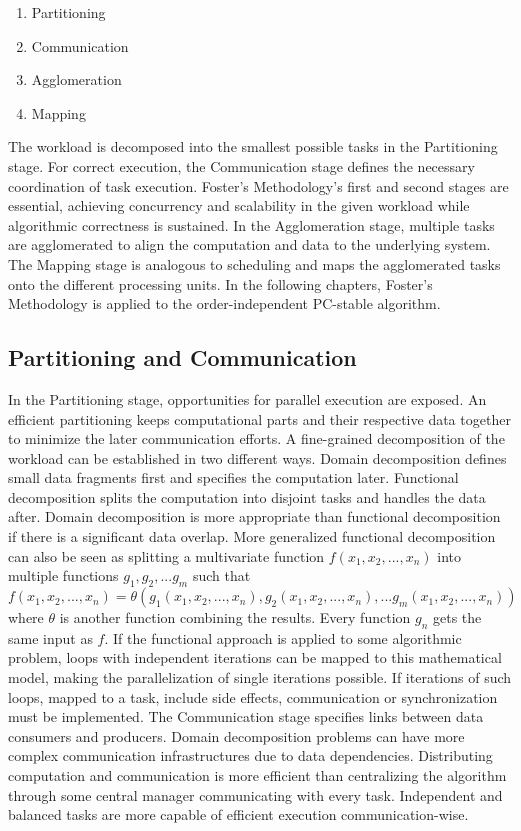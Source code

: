 \begin{enumerate}
    \item Partitioning
    \item Communication
    \item Agglomeration 
    \item Mapping
\end{enumerate}

The workload is decomposed into the smallest possible tasks in the Partitioning stage. For correct execution, the Communication stage defines the necessary coordination of task execution. Foster's Methodology's first and second stages are essential, achieving concurrency and scalability in the given workload while algorithmic correctness is sustained. In the Agglomeration stage, multiple tasks are agglomerated to align the computation and data to the underlying system. The Mapping stage is analogous to scheduling and maps the agglomerated tasks onto the different processing units. In the following chapters, Foster's Methodology is applied to the order-independent PC-stable algorithm.

\subsection{Partitioning and Communication}
In the Partitioning stage, opportunities for parallel execution are exposed. An efficient partitioning keeps computational parts and their respective data together to minimize the later communication efforts. A fine-grained decomposition of the workload can be established in two different ways. Domain decomposition defines small data fragments first and specifies the computation later. Functional decomposition splits the computation into disjoint tasks and handles the data after. Domain decomposition is more appropriate than functional decomposition if there is a significant data overlap.
More generalized functional decomposition can also be seen as splitting a multivariate function $f(x_1,x_2,...,x_n)$ into multiple functions ${g_1,g_2,...g_m}$ such that $f(x_1,x_2,...,x_n) = \theta(g_1(x_1,x_2,...,x_n),g_2(x_1,x_2,...,x_n),...g_m(x_1,x_2,...,x_n))$ where $\theta$ is another function combining the results. Every function $g_n$ gets the same input as $f$. If the functional approach is applied to some algorithmic problem, loops with independent iterations can be mapped to this mathematical model, making the parallelization of single iterations possible. If iterations of such loops, mapped to a task, include side effects, communication or synchronization must be implemented.
The Communication stage specifies links between data consumers and producers. Domain decomposition problems can have more complex communication infrastructures due to data dependencies. Distributing computation and communication is more efficient than centralizing the algorithm through some central manager communicating with every task. Independent and balanced tasks are more capable of efficient execution communication-wise.


